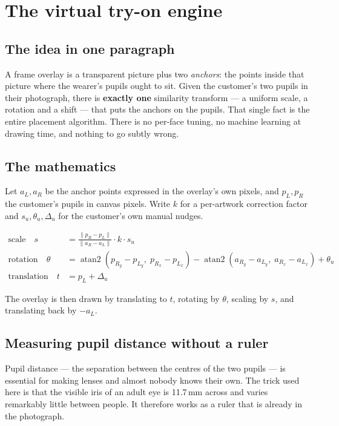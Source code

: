 \documentclass[11pt,a4paper]{report}
\begin{document}
\chapter{The virtual try-on engine}

\section{The idea in one paragraph}

A frame overlay is a transparent picture plus two \emph{anchors}: the points
inside that picture where the wearer's pupils ought to sit. Given the
customer's two pupils in their photograph, there is \textbf{exactly one}
similarity transform --- a uniform scale, a rotation and a shift --- that puts
the anchors on the pupils. That single fact is the entire placement algorithm.
There is no per-face tuning, no machine learning at drawing time, and nothing
to go subtly wrong.

\section{The mathematics}

Let $a_L, a_R$ be the anchor points expressed in the overlay's own pixels, and
$p_L, p_R$ the customer's pupils in canvas pixels. Write $k$ for a per-artwork
correction factor and $s_u, \theta_u, \Delta_u$ for the customer's own manual
nudges.

\begin{align}
\text{scale} \quad s &= \frac{\lVert p_R - p_L \rVert}{\lVert a_R - a_L \rVert}\cdot k \cdot s_u \\[4pt]
\text{rotation} \quad \theta &=
  \operatorname{atan2}\!\left(p_{R_y}-p_{L_y},\; p_{R_x}-p_{L_x}\right)
  -\operatorname{atan2}\!\left(a_{R_y}-a_{L_y},\; a_{R_x}-a_{L_x}\right)
  +\theta_u \\[4pt]
\text{translation} \quad t &= p_L + \Delta_u
\end{align}

The overlay is then drawn by translating to $t$, rotating by $\theta$, scaling
by $s$, and translating back by $-a_L$.

\section{Measuring pupil distance without a ruler}

Pupil distance --- the separation between the centres of the two pupils --- is
essential for making lenses and almost nobody knows their own. The trick used
here is that the visible iris of an adult eye is 11.7\,mm across and varies
remarkably little between people. It therefore works as a ruler that is
already in the photograph.
\end{document}
